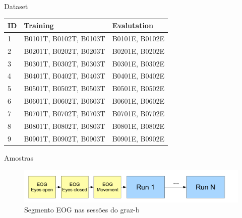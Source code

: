 \documentclass{beamer}
\begin{document}

\begin{frame}{Dataset}

 	\centering
 	\begin{table}[]
        \begin{tabular}{lll}
        \hline
        ID & Training               & Evalutation    \\ \hline
        1  & B0101T, B0102T, B0103T & B0101E, B0102E \\
        2  & B0201T, B0202T, B0203T & B0201E, B0202E \\
        3  & B0301T, B0302T, B0303T & B0301E, B0302E \\
        4  & B0401T, B0402T, B0403T & B0401E, B0402E \\
        5  & B0501T, B0502T, B0503T & B0501E, B0502E \\
        6  & B0601T, B0602T, B0603T & B0601E, B0602E \\
        7  & B0701T, B0702T, B0703T & B0701E, B0702E \\
        8  & B0801T, B0802T, B0803T & B0801E, B0802E \\
        9  & B0901T, B0902T, B0903T & B0901E, B0902E \\ \hline
        \end{tabular}
        \end{table}
 	 \caption{ \cite{GrazBData}}	
 	\label{fig:Data-Graz}
\end{frame}

\begin{frame}{Amostras}
 \begin{figure}[h!]
 	\centering
 	\includegraphics[scale=0.42]{./Images/graz-eog}
 	 \caption{Segmento EOG nas sess\~oes do graz-b \cite{GrazBData}}	
 	\label{fig:Graz-EOG}
 \end{figure}
\end{frame}
\end{document}
